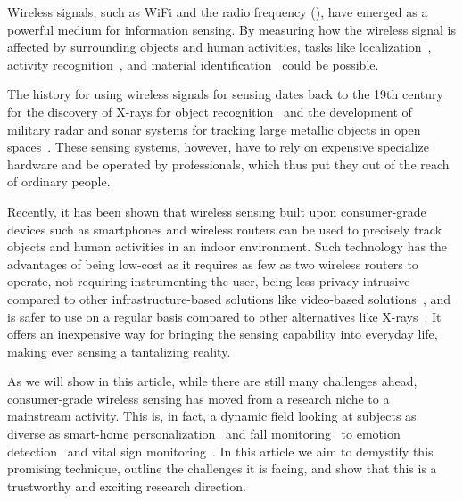 Wireless signals, such as WiFi and the radio frequency (\RF), have emerged as a powerful medium for information sensing. By measuring how
the wireless signal is affected by surrounding objects and human activities, tasks like localization~\cite{Arraytrack, Tagoram}, activity
recognition~\cite{Wang2015Understanding, wang2016human}, and material identification~\cite{Tagscan, LiquID, zhao2018rf} could be possible.


The history for using wireless signals for sensing dates back to the 19th century  for the discovery of X-rays for object
recognition~\cite{Suzuki1996} and the development of military radar and sonar systems for tracking large metallic objects in open
spaces~\cite{Au1988Sonar}. These sensing systems, however, have to rely on expensive specialize hardware and be operated by professionals, which
thus put they out of the reach of ordinary people.


Recently, it has been shown that wireless sensing built upon consumer-grade devices such as smartphones and wireless routers can be used to
precisely track objects and human activities in an indoor environment. Such technology has the advantages of being low-cost as it requires
as few as two wireless routers to operate, not requiring instrumenting the user, being less privacy intrusive compared to other
infrastructure-based solutions like video-based solutions~\cite{Cruz2015Quantification}, and is safer to use on a regular basis compared to
other alternatives like X-rays~\cite{De2013B}. It offers an inexpensive way for bringing the sensing capability into everyday life, making
ever sensing a tantalizing reality.

As we will show in this article, while there are still many challenges ahead, consumer-grade wireless sensing has moved from a research
niche to a mainstream activity. This is, in fact, a dynamic field looking at subjects as diverse as smart-home personalization~\cite{vasisht2016decimeter} and
fall monitoring~\cite{wang2017wifall} to emotion detection~\cite{Zhao2017Emotion} and vital sign monitoring~\cite{Smart-homes}. In this article we aim to demystify this promising
technique, outline the challenges it is facing, and show that this is a trustworthy and exciting research direction.






